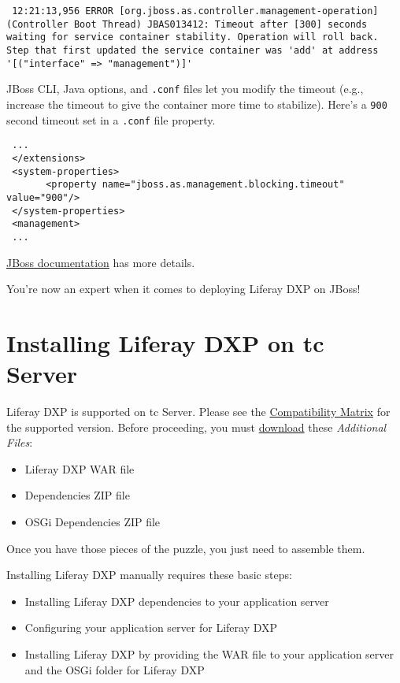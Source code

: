 \begin{verbatim}
 12:21:13,956 ERROR [org.jboss.as.controller.management-operation] (Controller Boot Thread) JBAS013412: Timeout after [300] seconds waiting for service container stability. Operation will roll back. Step that first updated the service container was 'add' at address '[("interface" => "management")]'
\end{verbatim}

JBoss CLI, Java options, and \texttt{.conf} files let you modify the
timeout (e.g., increase the timeout to give the container more time to
stabilize). Here's a \texttt{900} second timeout set in a \texttt{.conf}
file property.

\begin{verbatim}
 ...
 </extensions>
 <system-properties>
       <property name="jboss.as.management.blocking.timeout" value="900"/>
 </system-properties>
 <management>
 ...
\end{verbatim}

\href{https://access.redhat.com/solutions/1190323}{JBoss documentation}
has more details.

\noindent\hrulefill

You're now an expert when it comes to deploying Liferay DXP on JBoss!

\section{Installing Liferay DXP on tc
Server}\label{installing-liferay-dxp-on-tc-server}

Liferay DXP is supported on tc Server. Please see the
\href{https://web.liferay.com/documents/14/21598941/Liferay+DXP+Compatibility+Matrix.pdf}{Compatibility
Matrix} for the supported version. Before proceeding, you must
\href{https://help.liferay.com/hc}{download} these \emph{Additional
Files}:

\begin{itemize}
\tightlist
\item
  Liferay DXP WAR file
\item
  Dependencies ZIP file
\item
  OSGi Dependencies ZIP file
\end{itemize}

Once you have those pieces of the puzzle, you just need to assemble
them.

Installing Liferay DXP manually requires these basic steps:

\begin{itemize}
\tightlist
\item
  Installing Liferay DXP dependencies to your application server
\item
  Configuring your application server for Liferay DXP
\item
  Installing Liferay DXP by providing the WAR file to your application
  server and the OSGi folder for Liferay DXP
\end{itemize}

